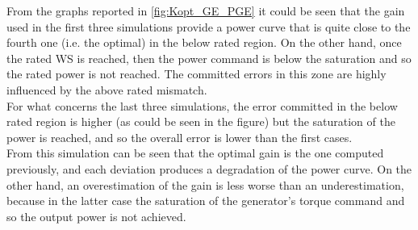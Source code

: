 From the graphs reported in \autoref{fig:Kopt_GE_PGE} it could be seen that the gain used in the first three simulations provide a power curve that is quite close to the fourth one (i.e. the optimal) in the below rated region. On the other hand, once the rated WS is reached, then the power command is below the saturation and so the rated power is not reached. The committed errors in this zone are highly influenced by the above rated mismatch. \\
For what concerns the last three simulations, the error committed in the below rated region is higher (as could be seen in the figure) but the saturation of the power is reached, and so the overall error is lower than the first cases. \\
From this simulation can be seen that the optimal gain is the one computed previously, and each deviation produces a degradation of the power curve. On the other hand, an overestimation of the gain is less worse than an underestimation, because in the latter case the saturation of the generator's torque command and so the output power is not achieved.
 
                    
